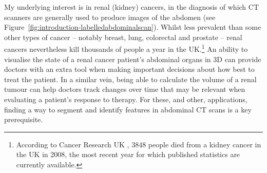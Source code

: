 
My underlying interest is in renal (kidney) cancers, in the diagnosis of which CT scanners are generally used to produce images of the abdomen (see Figure~\ref{fig:introduction-labelledabdominalscan}). Whilst less prevalent than some other types of cancer -- notably breast, lung, colorectal and prostate -- renal cancers nevertheless kill thousands of people a year in the UK.\footnote{According to Cancer Research UK \cite{cruk-kidneycancermortality}, 3848 people died from a kidney cancer in the UK in 2008, the most recent year for which published statistics are currently available.} An ability to visualise the state of a renal cancer patient's abdominal organs in 3D can provide doctors with an extra tool when making important decisions about how best to treat the patient. In a similar vein, being able to calculate the volume of a renal tumour can help doctors track changes over time that may be relevant when evaluating a patient's response to therapy. For these, and other, applications, finding a way to segment and identify features in abdominal CT scans is a key prerequisite.


